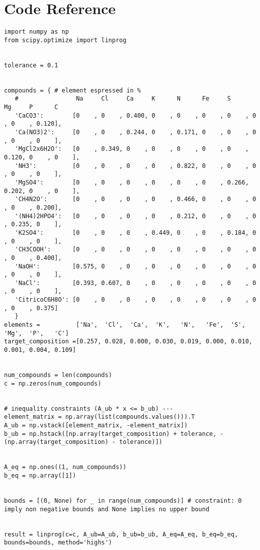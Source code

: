 \documentclass{article}
\begin{document}
\section{Code Reference}
\begin{lstlisting}
import numpy as np
from scipy.optimize import linprog


tolerance = 0.1


compounds = { # element espressed in %
   #                Na     Cl     Ca     K      N      Fe     S      Mg     P      C
   'CaCO3':        [0    , 0    , 0.400, 0    , 0    , 0    , 0    , 0    , 0    , 0.120],
   'Ca(NO3)2':     [0    , 0    , 0.244, 0    , 0.171, 0    , 0    , 0    , 0    , 0    ],
   'MgCl2x6H2O':   [0    , 0.349, 0    , 0    , 0    , 0    , 0    , 0.120, 0    , 0    ],
   'NH3':          [0    , 0    , 0    , 0    , 0.822, 0    , 0    , 0    , 0    , 0    ],
   'MgSO4':        [0    , 0    , 0    , 0    , 0    , 0    , 0.266, 0.202, 0    , 0    ],
   'CH4N2O':       [0    , 0    , 0    , 0    , 0.466, 0    , 0    , 0    , 0    , 0.200],
   '(NH4)2HPO4':   [0    , 0    , 0    , 0    , 0.212, 0    , 0    , 0    , 0.235, 0    ],
   'K2SO4':        [0    , 0    , 0    , 0.449, 0    , 0    , 0.184, 0    , 0    , 0    ],
   'CH3COOH':      [0    , 0    , 0    , 0    , 0    , 0    , 0    , 0    , 0    , 0.400],
   'NaOH':         [0.575, 0    , 0    , 0    , 0    , 0    , 0    , 0    , 0    , 0    ],
   'NaCl':         [0.393, 0.607, 0    , 0    , 0    , 0    , 0    , 0    , 0    , 0    ],
   'CitricoC6H8O': [0    , 0    , 0    , 0    , 0    , 0    , 0    , 0    , 0    , 0.375]
   }
elements =          ['Na',  'Cl',  'Ca',  'K',   'N',   'Fe',  'S',   'Mg',  'P',   'C']
target_composition =[0.257, 0.028, 0.000, 0.030, 0.019, 0.000, 0.010, 0.001, 0.004, 0.109]


num_compounds = len(compounds)
c = np.zeros(num_compounds)


# inequality constraints (A_ub * x <= b_ub) ---
element_matrix = np.array(list(compounds.values())).T 
A_ub = np.vstack([element_matrix, -element_matrix])
b_ub = np.hstack([np.array(target_composition) + tolerance, -(np.array(target_composition) - tolerance)])


A_eq = np.ones((1, num_compounds))
b_eq = np.array([1])


bounds = [(0, None) for _ in range(num_compounds)] # constraint: 0 imply non negative bounds and None implies no upper bound


result = linprog(c=c, A_ub=A_ub, b_ub=b_ub, A_eq=A_eq, b_eq=b_eq, bounds=bounds, method='highs')



\end{lstlisting}
\end{document}
